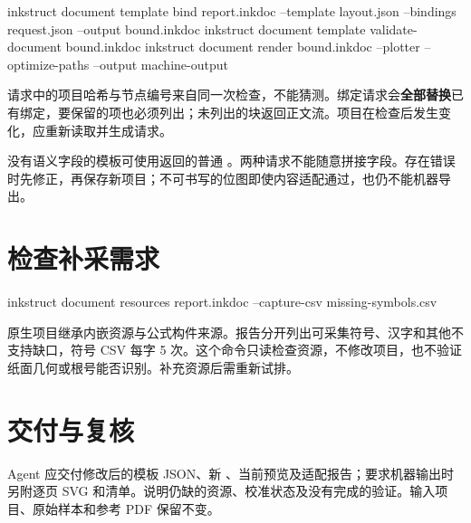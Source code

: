 \par\noindent\begin{minipage}{\linewidth}
\begin{Source}
inkstruct document template bind report.inkdoc --template layout.json --bindings request.json --output bound.inkdoc
inkstruct document template validate-document bound.inkdoc
inkstruct document render bound.inkdoc --plotter --optimize-paths --output machine-output
\end{Source}
\end{minipage}\par\medskip
请求中的项目哈希与节点编号来自同一次检查，不能猜测。绑定请求会\textbf{全部替换}已有绑定，要保留的项也必须列出；未列出的块返回正文流。项目在检查后发生变化，应重新读取并生成请求。

没有语义字段的模板可使用返回的普通 。两种请求不能随意拼接字段。存在错误时先修正，再保存新项目；不可书写的位图即使内容适配通过，也仍不能机器导出。

\section{检查补采需求}
\par\noindent\begin{minipage}{\linewidth}
\begin{Source}
inkstruct document resources report.inkdoc --capture-csv missing-symbols.csv
\end{Source}
\end{minipage}\par\medskip
原生项目继承内嵌资源与公式构件来源。报告分开列出可采集符号、汉字和其他不支持缺口，符号 CSV 每字 5 次。这个命令只读检查资源，不修改项目，也不验证纸面几何或根号能否识别。补充资源后需重新试排。

\section{交付与复核}
Agent 应交付修改后的模板 JSON、新 、当前预览及适配报告；要求机器输出时另附逐页 SVG 和清单。说明仍缺的资源、校准状态及没有完成的验证。输入项目、原始样本和参考 PDF 保留不变。


